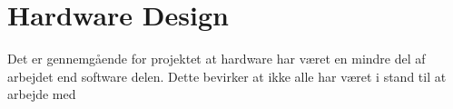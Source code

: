 \section{Hardware Design}
\label{ch:HWdesign}

Det er gennemgående for projektet at hardware har været en mindre del af arbejdet end software delen. Dette bevirker at ikke alle har været i stand til at arbejde med 




\clearpage